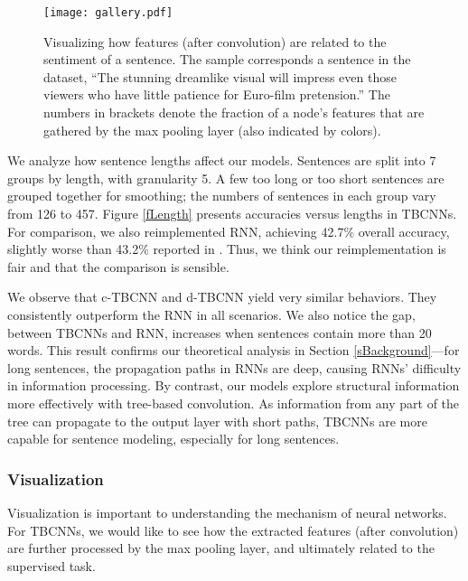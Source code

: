 \documentclass[11pt,a4paper]{article}
\begin{document}
\begin{figure*}[!t]
\centering

\vspace{-.5cm}

\texttt{[image: gallery.pdf]}

\vspace{-.4cm}

\caption{Visualizing how features (after convolution) are related to the sentiment of a sentence. The sample corresponds a sentence in the dataset, ``The stunning dreamlike visual will impress even those viewers who have little patience for Euro-film pretension.''
The numbers in brackets denote the fraction
of a node's features  that are gathered by the max pooling layer
(also indicated by colors).}\label{fVisual}
\vspace{-.4cm}
\end{figure*}

We analyze how sentence lengths affect our models.
Sentences are split into 7 groups by length, with granularity 5.
A few too long or too short sentences are grouped together for smoothing;
the numbers of sentences in each group vary from 126 to 457.
Figure \ref{fLength} presents accuracies versus lengths
in TBCNNs.
For comparison, we also reimplemented RNN, achieving 42.7\% overall accuracy,
slightly worse than 43.2\% reported in .
Thus, we think
our reimplementation is fair and that the comparison is sensible.

We observe that c-TBCNN and  d-TBCNN yield very similar behaviors.
They consistently outperform the RNN in all scenarios.
We also notice the gap, between TBCNNs and RNN, increases
when sentences contain more than 20 words.
This result confirms our theoretical analysis in Section \ref{sBackground}---for 
long sentences, the propagation paths in RNNs are deep, causing
RNNs' difficulty in information processing.
By contrast, our models explore structural information more effectively
with tree-based convolution. As information from any part of the tree
can propagate to the output layer with short paths,
TBCNNs are more capable for sentence modeling, especially for long sentences.


\subsubsection{Visualization}

Visualization is important to understanding
the mechanism of neural networks.
For TBCNNs, we would like to see how the extracted features (after convolution)
are further processed by the max pooling layer, and ultimately related to the supervised task.
\end{document}
